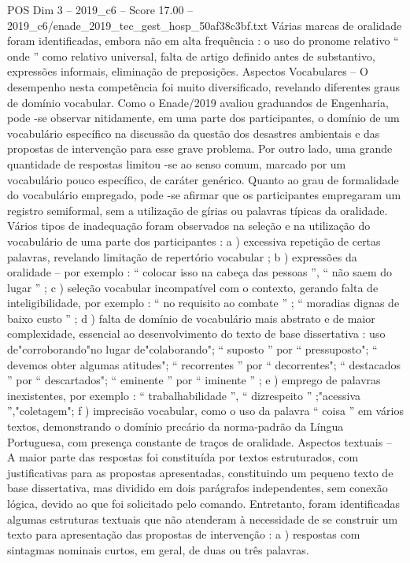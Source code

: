 \begin{textsample}{POS Dim 3 – 2019\_c6 – Score 17.00 – 2019\_c6/enade\_2019\_tec\_gest\_hosp\_50af38c3bf.txt}
Várias marcas de oralidade foram identificadas, embora não em alta frequência : o uso do pronome relativo “ onde ” como relativo universal, falta de artigo definido antes de substantivo, expressões informais, eliminação de preposições.
Aspectos Vocabulares – O desempenho nesta competência foi muito diversificado, revelando diferentes graus de domínio vocabular.
Como o Enade/2019 avaliou graduandos de Engenharia, pode -se observar nitidamente, em uma parte dos participantes, o domínio de um vocabulário específico na discussão da questão dos desastres ambientais e das propostas de intervenção para esse grave problema.
Por outro lado, uma grande quantidade de respostas limitou -se ao senso comum, marcado por um vocabulário pouco específico, de caráter genérico.
Quanto ao grau de formalidade do vocabulário empregado, pode -se afirmar que os participantes empregaram um registro semiformal, sem a utilização de gírias ou palavras típicas da oralidade.
Vários tipos de inadequação foram observados na seleção e na utilização do vocabulário de uma parte dos participantes : a ) excessiva repetição de certas palavras, revelando limitação de repertório vocabular ; b ) expressões da oralidade – por exemplo : “ colocar isso na cabeça das pessoas ”, “ não saem do lugar ” ; c ) seleção vocabular incompatível com o contexto, gerando falta de inteligibilidade, por exemplo : “ no requisito ao combate ” ; “ moradias dignas de baixo custo ” ; d ) falta de domínio de vocabulário mais abstrato e de maior complexidade, essencial ao desenvolvimento do texto de base dissertativa : uso de"corroborando"no lugar de"colaborando"; “ suposto ” por “ pressuposto"; “ devemos obter algumas atitudes"; “ recorrentes ” por “ decorrentes"; “ destacados ” por “ descartados"; “ eminente ” por “ iminente ” ; e ) emprego de palavras inexistentes, por exemplo : “ trabalhabilidade ”, “ dizrespeito ” ;"acessiva ”,"coletagem"; f ) imprecisão vocabular, como o uso da palavra “ coisa ” em vários textos, demonstrando o domínio precário da norma-padrão da Língua Portuguesa, com presença constante de traços de oralidade.
Aspectos textuais – A maior parte das respostas foi constituída por textos estruturados, com justificativas para as propostas apresentadas, constituindo um pequeno texto de base dissertativa, mas dividido em dois parágrafos independentes, sem conexão lógica, devido ao que foi solicitado pelo comando.
Entretanto, foram identificadas algumas estruturas textuais que não atenderam à necessidade de se construir um texto para apresentação das propostas de intervenção : a ) respostas com sintagmas nominais curtos, em geral, de duas ou três palavras.

\end{textsample}
